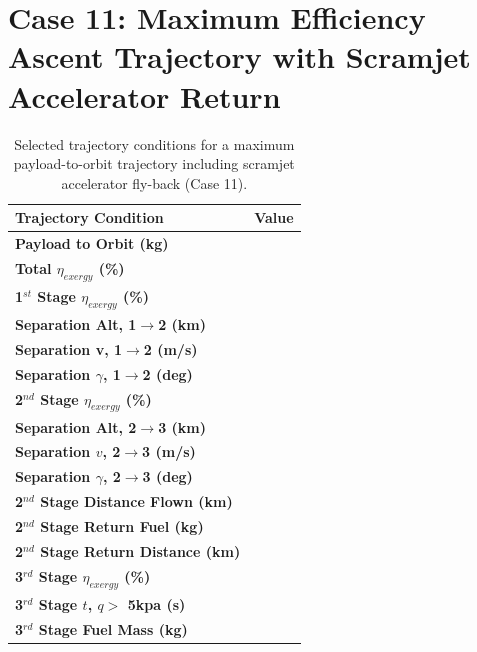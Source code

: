 \section{Case 11: Maximum Efficiency Ascent Trajectory with Scramjet Accelerator Return}\label{sec:case11}
\begin{table}[ht] %
	\centering
\begin{tabular}{l c } 
	\hline \textbf{Trajectory Condition}
	&Value 
	\\
	\hline \textbf{Payload to Orbit (kg)}
	& \textbf{\PayloadToOrbitStandard}
	\\
	\textbf{Total $\eta_{exergy}$ (\%)}
	& \textbf{\totalExergyEffStandard}
	\\
	\hline 
	\textbf{1$^{st}$ Stage $\eta_{exergy}$ (\%)}
	& \textbf{\firstExergyEffStandard}
	\\

	\textbf{Separation Alt, 1$\rightarrow$2 (km)}
	& \firstsecondSeparationAltStandard
	\\
	\textbf{Separation v, 1$\rightarrow$2 (m/s)}
	& \firstsecondSeparationvStandard
	\\
	\textbf{Separation $\gamma$, 1$\rightarrow$2 (deg)}
	& \firstsecondSeparationgammaStandard
	\\
	\hline 
	\textbf{2$^{nd}$ Stage $\eta_{exergy}$ (\%)}
	& \textbf{\secondExergyEffStandard}
	\\

	\textbf{Separation Alt, 2$\rightarrow$3 (km)}
	& \secondthirdSeparationAltStandard
	\\
	\textbf{Separation $v$, 2$\rightarrow$3 (m/s)}
	& \secondthirdSeparationvStandard
	\\
	\textbf{Separation $\gamma$, 2$\rightarrow$3 (deg)}
	& \secondthirdSeparationgammaStandard
	\\

	\textbf{2$^{nd}$ Stage Distance Flown (km)}
	& \SecondDistStandard
	\\
	\textbf{2$^{nd}$ Stage Return Fuel (kg)}
	& \returnFuelStandard
	\\
	\textbf{2$^{nd}$ Stage Return Distance (km)}
	& \returnDistStandard
	\\
	\hline 
	\textbf{3$^{rd}$ Stage $\eta_{exergy}$ (\%)}
	& \textbf{\thirddExergyEffStandard}
	\\

	\textbf{3$^{rd}$ Stage $t$, $q >$ 5kpa (s)}
	& \thirdqOverFiveStandard
	\\
	\textbf{3$^{rd}$ Stage Fuel Mass (kg)}
	& \thirdmFuelStandard
	\\
	\hline 
\end{tabular} 
\caption{Selected trajectory conditions for a maximum payload-to-orbit trajectory including scramjet accelerator fly-back (Case 11).}
\end{table}

